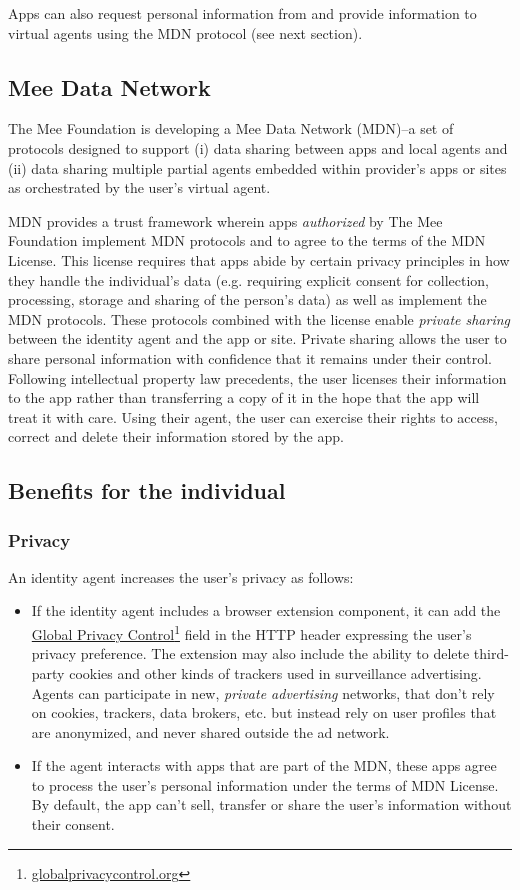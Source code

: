 \documentclass[11pt, oneside]{article}   	%
\newcommand{\hyperfootnote}[1][]{\def\ArgI{{#1}}\hyperfootnoteRelay}
\newcommand\hyperfootnoteRelay[2][]{\href{#1#2}{\ArgI}\footnote{\href{#1#2}{#2}}}
\begin{document}
Apps can also request personal information from and provide information to virtual agents using the MDN protocol (see next section).

\subsection{Mee Data Network}

The Mee Foundation is developing a Mee Data Network (MDN)--a set of protocols designed to support (i) data sharing between apps and local agents and (ii) data sharing multiple partial agents embedded within provider's apps or sites as orchestrated by the user's virtual agent.

MDN provides a trust framework wherein apps \emph{authorized} by The Mee Foundation implement MDN protocols and to agree to the terms of the MDN License. This license requires that apps abide by certain privacy principles in how they handle the individual's data (e.g. requiring explicit consent for collection, processing, storage and sharing of the person's data) as well as implement the MDN protocols. These protocols combined with the license enable \emph{private sharing} between the identity agent and the app or site. Private sharing allows the user to share personal information with confidence that it remains under their control. Following intellectual property law precedents, the user licenses their information to the app rather than transferring a copy of it in the hope that the app will treat it with care. Using their agent, the user can exercise their rights to access, correct and delete their information stored by the app.

\subsection{Benefits for the individual}

\subsubsection{Privacy}

An identity agent increases the user's privacy as follows:
\begin{itemize}
	\item If the identity agent includes a browser extension component, it can add the \hyperfootnote[Global Privacy Control][https://]{globalprivacycontrol.org} field in the HTTP header expressing the user's privacy preference. The extension may also include the ability to delete third-party cookies and other kinds of trackers used in surveillance advertising. Agents can participate in new, \emph{private advertising} networks, that don't rely on cookies, trackers, data brokers, etc. but instead rely on user profiles that are anonymized, and never shared outside the ad network. 
	\item If the agent interacts with apps that are part of the MDN, these apps agree to process the user's personal information under the terms of MDN License. By default, the app can't sell, transfer or share the user's information without their consent. 
\end{itemize}
\end{document}
